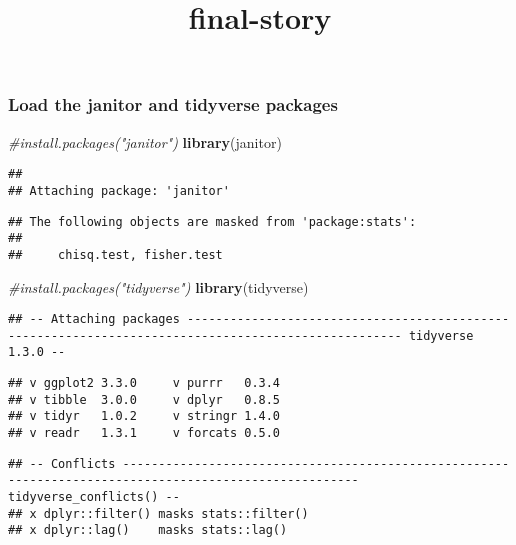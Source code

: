 \documentclass[
]{article}
\title{final-story}
\author{}
\date{\vspace{-2.5em}}
\newenvironment{Shaded}{\begin{snugshade}}{\end{snugshade}}
\newcommand{\CommentTok}[1]{\textcolor[rgb]{0.56,0.35,0.01}{\textit{#1}}}
\newcommand{\KeywordTok}[1]{\textcolor[rgb]{0.13,0.29,0.53}{\textbf{#1}}}
\newcommand{\NormalTok}[1]{#1}
\begin{document}
\maketitle

\hypertarget{load-the-janitor-and-tidyverse-packages}{%
\subsubsection{Load the janitor and tidyverse
packages}\label{load-the-janitor-and-tidyverse-packages}}

\begin{Shaded}
\begin{Highlighting}[]
\CommentTok{#install.packages("janitor")}
\KeywordTok{library}\NormalTok{(janitor)}
\end{Highlighting}
\end{Shaded}

\begin{verbatim}
## 
## Attaching package: 'janitor'
\end{verbatim}

\begin{verbatim}
## The following objects are masked from 'package:stats':
## 
##     chisq.test, fisher.test
\end{verbatim}

\begin{Shaded}
\begin{Highlighting}[]
\CommentTok{#install.packages("tidyverse")}
\KeywordTok{library}\NormalTok{(tidyverse)}
\end{Highlighting}
\end{Shaded}

\begin{verbatim}
## -- Attaching packages ---------------------------------------------------------------------------------------------------- tidyverse 1.3.0 --
\end{verbatim}

\begin{verbatim}
## v ggplot2 3.3.0     v purrr   0.3.4
## v tibble  3.0.0     v dplyr   0.8.5
## v tidyr   1.0.2     v stringr 1.4.0
## v readr   1.3.1     v forcats 0.5.0
\end{verbatim}

\begin{verbatim}
## -- Conflicts ------------------------------------------------------------------------------------------------------- tidyverse_conflicts() --
## x dplyr::filter() masks stats::filter()
## x dplyr::lag()    masks stats::lag()
\end{verbatim}
\end{document}
